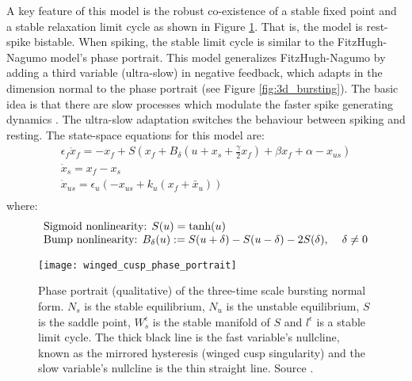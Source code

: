 \documentclass[a4paper, 12pt]{article}
\begin{document}
A key feature of this model is the robust co-existence of a stable fixed point and a stable relaxation limit cycle as shown in Figure \ref{fig:bursting_fundamental_phase_portait}. That is, the model is rest-spike bistable. When spiking, the stable limit cycle is similar to the FitzHugh-Nagumo model's phase portrait. This model generalizes FitzHugh-Nagumo by adding a third variable (ultra-slow) in negative feedback, which adapts in the dimension normal to the phase portrait (see Figure \ref{fig:3d_bursting}). The basic idea is that there are slow processes which modulate the faster spike generating dynamics \cite{rinzel}. The ultra-slow adaptation switches the behaviour between spiking and resting. The state-space equations for this model are:
\begin{equation}
\begin{array}{l}
\displaystyle \epsilon_f\dot{x}_{f} = -x_f + S\left(x_f + B_\delta\left(u + x_s + \tfrac{\gamma}{2}x_f\right) + \beta x_f + \alpha  - x_{us}  \right)\\
\displaystyle \dot{x}_{s} = x_f - x_s \\
\displaystyle \dot{x}_{us} = \epsilon_u\left(-x_{us} + k_u(x_f+\bar{x}_u) \right)\\
\end{array}
\label{eq:restSpikeBistability}
\end{equation}
where:
\begin{equation}
\begin{array}{l}
\displaystyle \text{Sigmoid nonlinearity: }S(u) = \text{tanh}(u) \\
\displaystyle \text{Bump nonlinearity: }B_\delta(u) := S(u+\delta) - S(u-\delta) -2S(\delta),\hspace{0.4cm} \delta\neq0
\end{array}
\end{equation}


\begin{figure}[h!]
\texttt{[image: winged\_cusp\_phase\_portrait]}
\caption{Phase portrait (qualitative) of the three-time scale bursting normal form. $N_s$ is the stable equilibrium, $N_u$ is the unstable equilibrium, $S$ is the saddle point, $W_s^\epsilon$ is the stable manifold of $S$ and $l^\epsilon$ is a stable limit cycle. The thick black line is the fast variable's nullcline, known as the mirrored hysteresis (winged cusp singularity) and the slow variable's nullcline is the thin straight line. Source \cite{franci2}.}
\label{fig:bursting_fundamental_phase_portait}
\end{figure}
\end{document}
